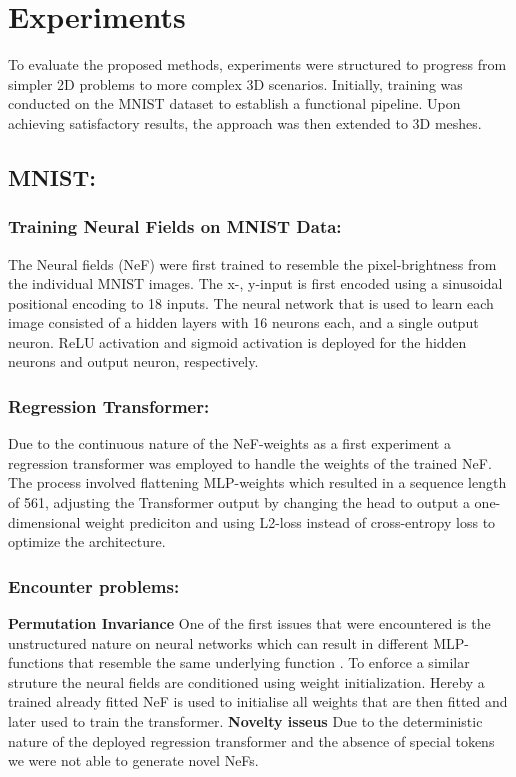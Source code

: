 \section{Experiments}
\label{sec:exper}
To evaluate the proposed methods, experiments were structured to progress from simpler 2D problems to more complex 3D scenarios. Initially, training was conducted on the MNIST dataset to establish a functional pipeline. Upon achieving satisfactory results, the approach was then extended to 3D meshes.

\subsection*{MNIST: }
\subsubsection*{Training Neural Fields on MNIST Data: }
The Neural fields (NeF) were first trained to resemble the pixel-brightness from the individual MNIST images. The x-, y-input is first encoded using a sinusoidal positional encoding to 18 inputs. The neural network that is used to learn each image consisted of a hidden layers with 16 neurons each, and a single output neuron. ReLU activation and sigmoid activation is deployed for the hidden neurons and output neuron, respectively.

\subsubsection*{Regression Transformer: }
Due to the continuous nature of the NeF-weights as a first experiment a regression transformer was employed to handle the weights of the trained NeF. The process involved flattening MLP-weights which resulted in a sequence length of 561, adjusting the Transformer output by changing the head to output a one-dimensional weight prediciton and using L2-loss instead of cross-entropy loss to optimize the architecture.

\subsubsection*{Encounter problems: }
\textbf{Permutation Invariance}
One of the first issues that were encountered is the unstructured nature on neural networks which can result in different MLP-functions that resemble the same underlying function \cite{HechtNielsen1990ONTA}. To enforce a similar struture the neural fields are conditioned using weight initialization. Hereby a trained already fitted NeF is used to initialise all weights that are then fitted and later used to train the transformer.
\textbf{Novelty isseus}
Due to the deterministic nature of the deployed regression transformer and the absence of special tokens we were not able to generate novel NeFs.

